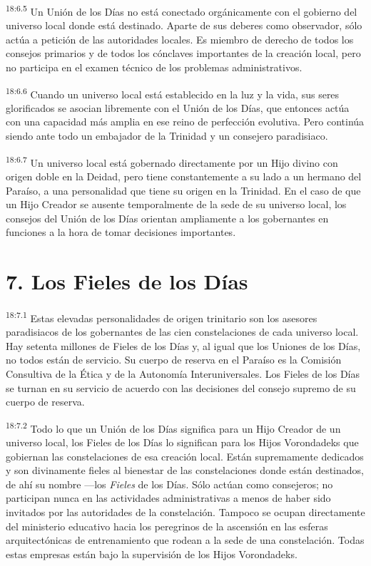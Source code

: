 \par
\textsuperscript{18:6.5} Un Unión de los Días no está conectado orgánicamente con el gobierno del universo local donde está destinado. Aparte de sus deberes como observador, sólo actúa a petición de las autoridades locales. Es miembro de derecho de todos los consejos primarios y de todos los cónclaves importantes de la creación local, pero no participa en el examen técnico de los problemas administrativos.

\par
\textsuperscript{18:6.6} Cuando un universo local está establecido en la luz y la vida, sus seres glorificados se asocian libremente con el Unión de los Días, que entonces actúa con una capacidad más amplia en ese reino de perfección evolutiva. Pero continúa siendo ante todo un embajador de la Trinidad y un consejero paradisiaco.

\par
\textsuperscript{18:6.7} Un universo local está gobernado directamente por un Hijo divino con origen doble en la Deidad, pero tiene constantemente a su lado a un hermano del Paraíso, a una personalidad que tiene su origen en la Trinidad. En el caso de que un Hijo Creador se ausente temporalmente de la sede de su universo local, los consejos del Unión de los Días orientan ampliamente a los gobernantes en funciones a la hora de tomar decisiones importantes.

\section*{7. Los Fieles de los Días}
\par
\textsuperscript{18:7.1} Estas elevadas personalidades de origen trinitario son los asesores paradisiacos de los gobernantes de las cien constelaciones de cada universo local. Hay setenta millones de Fieles de los Días y, al igual que los Uniones de los Días, no todos están de servicio. Su cuerpo de reserva en el Paraíso es la Comisión Consultiva de la Ética y de la Autonomía Interuniversales. Los Fieles de los Días se turnan en su servicio de acuerdo con las decisiones del consejo supremo de su cuerpo de reserva.

\par
\textsuperscript{18:7.2} Todo lo que un Unión de los Días significa para un Hijo Creador de un universo local, los Fieles de los Días lo significan para los Hijos Vorondadeks que gobiernan las constelaciones de esa creación local. Están supremamente dedicados y son divinamente fieles al bienestar de las constelaciones donde están destinados, de ahí su nombre ---los \textit{Fieles} de los Días. Sólo actúan como consejeros; no participan nunca en las actividades administrativas a menos de haber sido invitados por las autoridades de la constelación. Tampoco se ocupan directamente del ministerio educativo hacia los peregrinos de la ascensión en las esferas arquitectónicas de entrenamiento que rodean a la sede de una constelación. Todas estas empresas están bajo la supervisión de los Hijos Vorondadeks.

